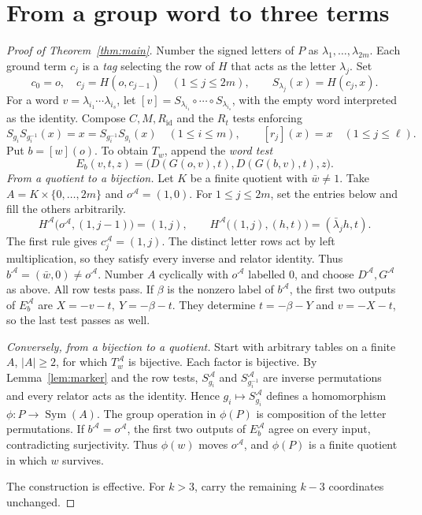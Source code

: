 \documentclass[a4paper,11pt]{article}
\DeclareMathOperator{\Sym}{Sym}
\newcommand{\id}{\mathrm{id}}
\newcommand{\A}{\mathcal A}
\newcommand{\word}[1]{[#1]}
\begin{document}
\section{From a group word to three terms}
\begin{proof}[Proof of Theorem~\ref{thm:main}]
Number the signed letters of \(P\) as \(\lambda_1,\ldots,\lambda_{2m}\). Each ground term \(c_j\) is a \emph{tag} selecting the row of \(H\) that acts as the letter \(\lambda_j\). Set
\[
 c_0=o,\quad c_j=H(o,c_{j-1})\quad(1\le j\le2m),\qquad S_{\lambda_j}(x)=H(c_j,x).
\]
For a word \(v=\lambda_{i_1}\cdots\lambda_{i_s}\), let \(\word v=S_{\lambda_{i_1}}\circ\cdots\circ S_{\lambda_{i_s}}\), with the empty word interpreted as the identity. Compose \(C,M,R_{\id}\) and the \(R_t\) tests enforcing
\[
 S_{g_i}S_{g_i^{-1}}(x)=x=S_{g_i^{-1}}S_{g_i}(x)
       \quad(1\le i\le m),\qquad
 \word{r_j}(x)=x\quad(1\le j\le\ell).
\]
Put \(b=\word w(o)\). To obtain \(T_w\), append the \emph{word test}
\[
             E_b(v,t,z)=\bigl(D(G(o,v),t),D(G(b,v),t),z\bigr).
\]
\emph{From a quotient to a bijection.}
Let \(K\) be a finite quotient with \(\bar w\ne1\). Take \(A=K\times\{0,\ldots,2m\}\) and \(o^{\A}=(1,0)\). For \(1\le j\le2m\), set the entries below and fill the others arbitrarily.
\[
 H^{\A}\bigl(o^{\A},(1,j-1)\bigr)=(1,j),\qquad
 H^{\A}\bigl((1,j),(h,t)\bigr)=(\bar\lambda_j h,t).
\]
The first rule gives \(c_j^{\A}=(1,j)\). The distinct letter rows act by left multiplication, so they satisfy every inverse and relator identity. Thus \(b^{\A}=(\bar w,0)\ne o^{\A}\). Number \(A\) cyclically with \(o^{\A}\) labelled \(0\), and choose \(D^{\A},G^{\A}\) as above. All row tests pass. If \(\beta\) is the nonzero label of \(b^{\A}\), the first two outputs of \(E_b^{\A}\) are \(X=-v-t,\ Y=-\beta-t\). They determine \(t=-\beta-Y\) and \(v=-X-t\), so the last test passes as well.

\emph{Conversely, from a bijection to a quotient.}
Start with arbitrary tables on a finite \(A\), \(|A|\ge2\), for which \(T_w^\A\) is bijective. Each factor is bijective. By Lemma~\ref{lem:marker} and the row tests, \(S_{g_i}^\A\) and \(S_{g_i^{-1}}^\A\) are inverse permutations and every relator acts as the identity. Hence \(g_i\mapsto S_{g_i}^\A\) defines a homomorphism \(\phi:P\to\Sym(A)\). The group operation in \(\phi(P)\) is composition of the letter permutations. If \(b^\A=o^\A\), the first two outputs of \(E_b^\A\) agree on every input, contradicting surjectivity. Thus \(\phi(w)\) moves \(o^\A\), and \(\phi(P)\) is a finite quotient in which \(w\) survives.

The construction is effective. For \(k>3\), carry the remaining \(k-3\) coordinates unchanged.
\end{proof}
\end{document}
